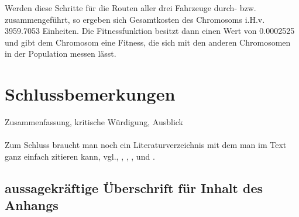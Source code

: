 \documentclass[a4paper,12pt,parskip,bibtotoc,liststotoc]{article}
\begin{document}
Werden diese Schritte für die Routen aller drei Fahrzeuge durch- bzw. zusammengeführt, so ergeben sich Gesamtkosten des Chromosoms i.H.v. 3959.7053 Einheiten.
Die Fitnessfunktion besitzt dann einen Wert von 0.0002525 und gibt dem Chromosom eine Fitness, die sich mit den anderen Chromosomen in der Population messen lässt.

 















\newpage









\section{Schlussbemerkungen}
Zusammenfassung, kritische Würdigung, Ausblick\\\\


Zum Schluss braucht man noch ein Literaturverzeichnis mit dem man im Text ganz einfach
zitieren kann, vgl.\cite{Det01}, \cite{OstSal04}, \cite{RieZimGla07}, \cite{SalPovNov08},
\cite{SchFlieBoy08} und \cite{ThaBosPet08}.

\newpage

\newpage
%
%
\begin{appendix}
\section{aussagekräftige Überschrift für Inhalt des Anhangs}

\end{appendix}
%
%
\end{document}
